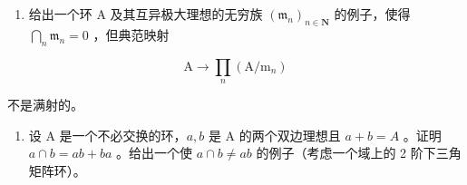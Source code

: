\begin{enumerate}
\def\labelenumi{\arabic{enumi}.}
\setcounter{enumi}{9}
\tightlist
\item
  给出一个环 A 及其互异极大理想的无穷族 \((\mathfrak{m}_n)_{n\in \mathbf{N}}\) 的例子，使得 \(\bigcap_{n}\mathfrak{m}_{n} = 0\) ，但典范映射
\end{enumerate}

\[
\mathrm{A} \rightarrow \prod_ {n} (\mathrm{A} / \mathrm{m} _ {n})
\]

不是满射的。

\begin{enumerate}
\def\labelenumi{\arabic{enumi}.}
\setcounter{enumi}{10}
\tightlist
\item
  设 A 是一个不必交换的环，\(a, b\) 是 A 的两个双边理想且 \(a + b = A\) 。证明 \(a \cap b = ab + ba\) 。给出一个使 \(a \cap b \neq ab\) 的例子（考虑一个域上的 2 阶下三角矩阵环）。
\end{enumerate}

